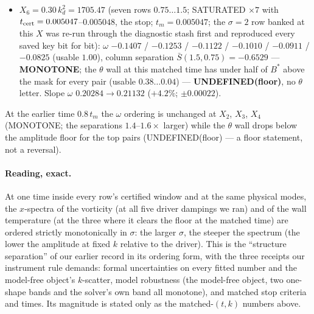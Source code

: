 \documentclass[11pt,a4paper]{article}
\newcommand{\kd}{k_d}
\newcommand{\tcert}{t_{\rm cert}}
\newcommand{\tm}{t_m}
\newcommand{\Bst}{B^*}
\newcommand{\Sbar}{\bar S}
\begin{document}
\begin{itemize}[leftmargin=1.5em]
\item $X_6=0.30\,\kd^2=1705.47$ (seven rows $0.75\dots1.5$; SATURATED $\times7$ with $\tcert=0.005047$--$0.005048$, the stop; $\tm=0.005047$; the $\sigma=2$ row banked at this $X$ was re-run through the diagnostic stash first and reproduced every saved key bit for bit): $\omega$ $-0.1407$ / $-0.1253$ / $-0.1122$ / $-0.1010$ / $-0.0911$ / $-0.0825$ (usable $1.00$), column separation $\Sbar(1.5,0.75)=-0.6529$ --- \textbf{MONOTONE}; the $\theta$ wall at this matched time has under half of $\Bst$ above the mask for every pair (usable $0.38\dots0.04$) --- \textbf{UNDEFINED(floor)}, no $\theta$ letter. Slope $\omega$ $0.20284\to0.21132$ ($+4.2\%$; $\pm0.00022$).
\end{itemize}
At the earlier time $0.8\,\tm$ the $\omega$ ordering is unchanged at $X_2$, $X_3$, $X_4$ (MONOTONE; the separations $1.4$--$1.6\times$ larger) while the $\theta$ wall drops below the amplitude floor for the top pairs (UNDEFINED(floor) --- a floor statement, not a reversal).

\paragraph{Reading, exact.} At one time inside every row's certified window and at the same physical modes, the $x$-spectra of the vorticity (at all five driver dampings we ran) and of the wall temperature (at the three where it clears the floor at the matched time) are ordered strictly monotonically in $\sigma$: the larger $\sigma$, the steeper the spectrum (the lower the amplitude at fixed $k$ relative to the driver). This is the ``structure separation'' of our earlier record in its ordering form, with the three receipts our instrument rule demands: formal uncertainties on every fitted number and the model-free object's $k$-scatter, model robustness (the model-free object, two one-shape bands and the solver's own band all monotone), and matched stop criteria and times. Its magnitude is stated only as the matched-$(t,k)$ numbers above.
\end{document}
